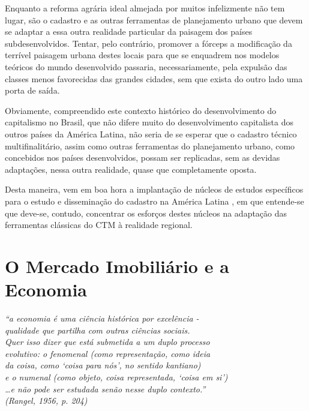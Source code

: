 \documentclass[
	12pt,				%
	oneside,			%
	a4paper,			%
	chapter=TITLE,		%
	section=TITLE,		%
	english,			%
	brazil				%
	]{abntex2}
\begin{document}
Enquanto a reforma agrária ideal almejada por muitos infelizmente não
tem lugar, são o cadastro e as outras ferramentas de planejamento urbano
que devem se adaptar a essa outra realidade particular da paisagem dos
países subdesenvolvidos. Tentar, pelo contrário, promover a fórceps a
modificação da terrível paisagem urbana destes locais para que se
enquadrem nos modelos teóricos do mundo desenvolvido passaria,
necessariamente, pela expulsão das classes menos favorecidas das grandes
cidades, sem que exista do outro lado uma porta de saída.

Obviamente, compreendido este contexto histórico do desenvolvimento do
capitalismo no Brasil, que não difere muito do desenvolvimento
capitalista dos outros países da América Latina, não seria de se esperar
que o cadastro técnico multifinalitário, assim como outras ferramentas
do planejamento urbano, como concebidos nos países desenvolvidos, possam
ser replicadas, sem as devidas adaptações, nessa outra realidade, quase
que completamente oposta.

Desta maneira, vem em boa hora a implantação de núcleos de estudos
específicos para o estudo e disseminação do cadastro na América Latina
\autocite{lalan}, em que entende-se que deve-se, contudo, concentrar os
esforços destes núcleos na adaptação das ferramentas clássicas do CTM à
realidade regional.

\hypertarget{economia}{\chapter{O Mercado Imobiliário e a
Economia}\label{economia}}
\begin{epigrafe}
    \vspace*{\fill}
    \begin{flushright}
    \textit{``a economia é uma ciência histórica por excelência -\\
    qualidade que partilha com outras ciências sociais.\\
    Quer isso dizer que está submetida a um duplo processo\\
    evolutivo: o fenomenal (como representação, como ideia \\
    da coisa, como `coisa para nós', no sentido kantiano)\\
    e o numenal (como objeto, coisa representada, `coisa em si')\\
    \ldots e não pode ser estudada senão nesse duplo contexto.''\\
    (Rangel, 1956, p. 204)}
    \end{flushright}
\end{epigrafe}
\end{document}
